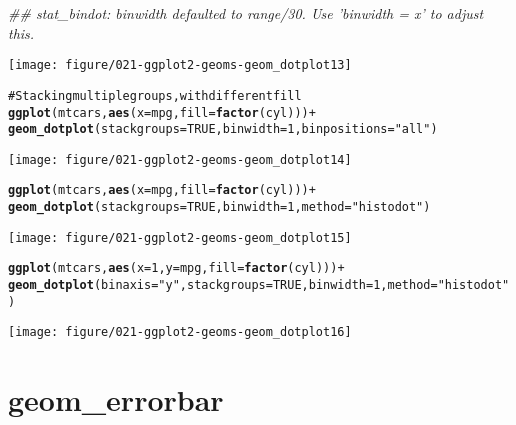\documentclass[a4paper,titlepage]{tufte-handout}\usepackage{graphicx, color}
\makeatletter
\def\maxwidth{ %
  \ifdim\Gin@nat@width>\linewidth
    \linewidth
  \else
    \Gin@nat@width
  \fi
}
\newcommand{\hlfunctioncall}[1]{\textcolor[rgb]{0.501960784313725,0,0.329411764705882}{\textbf{#1}}}%
\newcommand{\hlstring}[1]{\textcolor[rgb]{0.6,0.6,1}{#1}}%
\newcommand{\hlcomment}[1]{\textcolor[rgb]{0.180392156862745,0.6,0.341176470588235}{#1}}%
\newenvironment{kframe}{%
 \def\at@end@of@kframe{}%
 \ifinner\ifhmode%
  \def\at@end@of@kframe{\end{minipage}}%
  \begin{minipage}{\columnwidth}%
 \fi\fi%
 \def\FrameCommand##1{\hskip\@totalleftmargin \hskip-\fboxsep
 \colorbox{shadecolor}{##1}\hskip-\fboxsep
     \hskip-\linewidth \hskip-\@totalleftmargin \hskip\columnwidth}%
 \MakeFramed {\advance\hsize-\width
   \@totalleftmargin\z@ \linewidth\hsize
   \@setminipage}}%
 {\par\unskip\endMakeFramed%
 \at@end@of@kframe}
\newenvironment{knitrout}{}{} %
\makeatother
\begin{document}
\begin{knitrout}
\begin{kframe}
{\ttfamily\noindent\itshape\textcolor{messagecolor}{\#\# stat\_bindot: binwidth defaulted to range/30. Use 'binwidth = x' to adjust this.}}\end{kframe}\texttt{[image: figure/021-ggplot2-geoms-geom\_dotplot13]} \begin{kframe}\begin{alltt}
\hlcomment{# Stacking multiple groups, with different fill}
\hlfunctioncall{ggplot}(mtcars, \hlfunctioncall{aes}(x = mpg, fill = \hlfunctioncall{factor}(cyl))) +
  \hlfunctioncall{geom_dotplot}(stackgroups = TRUE, binwidth = 1, binpositions = \hlstring{"all"})
\end{alltt}
\end{kframe}\texttt{[image: figure/021-ggplot2-geoms-geom\_dotplot14]} \begin{kframe}\begin{alltt}
\hlfunctioncall{ggplot}(mtcars, \hlfunctioncall{aes}(x = mpg, fill = \hlfunctioncall{factor}(cyl))) +
  \hlfunctioncall{geom_dotplot}(stackgroups = TRUE, binwidth = 1, method = \hlstring{"histodot"})
\end{alltt}
\end{kframe}\texttt{[image: figure/021-ggplot2-geoms-geom\_dotplot15]} \begin{kframe}\begin{alltt}
\hlfunctioncall{ggplot}(mtcars, \hlfunctioncall{aes}(x = 1, y = mpg, fill = \hlfunctioncall{factor}(cyl))) +
  \hlfunctioncall{geom_dotplot}(binaxis = \hlstring{"y"}, stackgroups = TRUE, binwidth = 1, method = \hlstring{"histodot"})
\end{alltt}
\end{kframe}\texttt{[image: figure/021-ggplot2-geoms-geom\_dotplot16]} 
\end{knitrout}


\section{geom\_errorbar}
\end{document}
